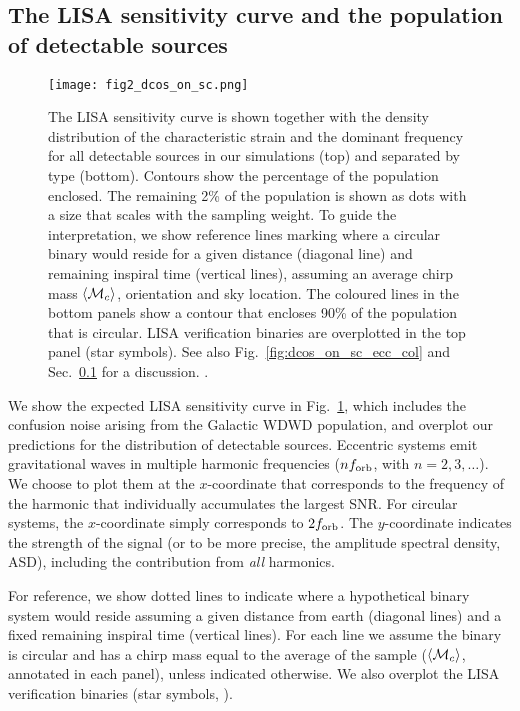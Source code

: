 \subsection{The LISA sensitivity curve and the population of detectable sources}\label{sec:dcos_on_sc}
\begin{figure*}[p]
    \centering
    \texttt{[image: fig2\_dcos\_on\_sc.png]}
    \caption{The LISA sensitivity curve is shown together with the density distribution of the characteristic strain and the dominant frequency for all detectable sources in our simulations (top) and separated by type (bottom). Contours show the percentage of the population enclosed. The remaining 2\% of the population is shown as dots with a size that scales with the sampling weight. To guide the interpretation, we show reference lines marking where a circular binary would reside for a given distance (diagonal line) and remaining inspiral time (vertical lines), assuming an average chirp mass $\left\langle\mathcal{M}_c\right\rangle$, orientation and sky location. The coloured lines in the bottom panels show a contour that encloses 90\% of the population that is circular. LISA verification binaries are overplotted in the top panel (star symbols).  See also Fig.~\ref{fig:dcos_on_sc_ecc_col} and Sec.~\ref{sec:dcos_on_sc} for a discussion. \href{https://github.com/TomWagg/detecting-DCOs-in-LISA/blob/main/paper/figures/fig2_dcos_on_sc.png}{\faFileImage} \href{https://github.com/TomWagg/detecting-DCOs-in-LISA/blob/main/paper/figure_notebooks/sensitivity_curve.ipynb}{\faBook}.}
    \label{fig:dcos_on_sc}
\end{figure*}
We show the expected LISA sensitivity curve \citep{Robson+2019} in Fig.~\ref{fig:dcos_on_sc}, which includes the confusion noise arising from the Galactic WDWD population, and overplot our predictions for the distribution of detectable sources. Eccentric systems emit gravitational waves in multiple harmonic frequencies ($n f_{\rm orb}$, with $n = 2, 3, \dots $). We choose to plot them at the $x$-coordinate that corresponds to the frequency of the harmonic that individually accumulates the largest SNR. For circular systems, the $x$-coordinate simply corresponds to $2 f_{\rm orb}$. The $y$-coordinate indicates the strength of the signal (or to be more precise, the amplitude spectral density, ASD), including the contribution from \textit{all} harmonics.

For reference, we show dotted lines to indicate where a hypothetical binary system would reside assuming a given distance from earth (diagonal lines) and a fixed remaining inspiral time (vertical lines). For each line we assume the binary is circular and has a chirp mass equal to the average of the sample ($\left\langle\mathcal{M}_c\right\rangle$, annotated in each panel), unless indicated otherwise. We also overplot the LISA verification binaries (star symbols, \citealt{Kupfer+2018}).

